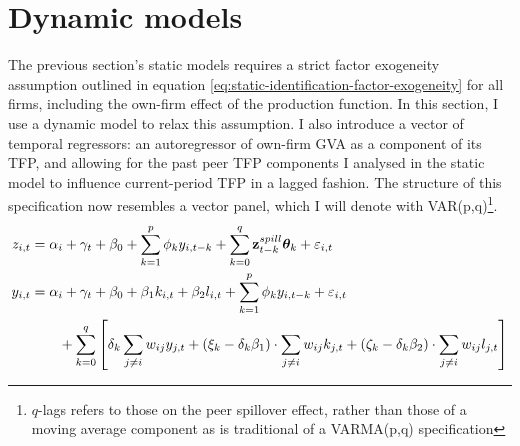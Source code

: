 \section{Dynamic models}
\label{s:models-dynamic}

The previous section's static models requires a strict factor exogeneity assumption
outlined in equation \eqref{eq:static-identification-factor-exogeneity}
for all firms, including the own-firm effect of the production function.
In this section, I use a dynamic model to relax this assumption.
I also introduce a vector of temporal regressors:
an autoregressor of own-firm GVA as a component of its TFP,
and allowing for the past peer TFP components I analysed
in the static model to influence current-period TFP
in a lagged fashion.
The structure of this specification now resembles a vector panel,
which I will denote with VAR(p,q)\footnote{$q$-lags refers
to those on the peer spillover effect, rather than those of a moving average component
as is traditional of a VARMA(p,q) specification}.
\begin{align}
    \label{eq:dyn-main-reduced}
    z_{i,t} &= \alpha_i + \gamma_t + \beta_0 + \sum_{k=1}^p\phi_k y_{i,t-k}
        + \sum_{k=0}^q\mathbf z_{t-k}^{spill}\boldsymbol\theta_k + \varepsilon_{i,t}
    \\
    \label{eq:dyn-main-peer-effects}
    y_{i,t} &= \alpha_i + \gamma_t + \beta_0 + \beta_1 k_{i,t} + \beta_2 l_{i,t} 
                + \sum_{k=1}^p\phi_k y_{i,t-k} + \varepsilon_{i,t}
                \\ \notag &\qquad 
                + \sum_{k=0}^q \left[
                    \delta_k \sum_{j\neq i} w_{ij}y_{j,t}
                    + (\xi_k-\delta_k\beta_1) \cdot \sum_{j\neq i} w_{ij}k_{j,t}
                    + (\zeta_k-\delta_k\beta_2) \cdot \sum_{j\neq i} w_{ij}l_{j,t}
                \right]
\end{align}

